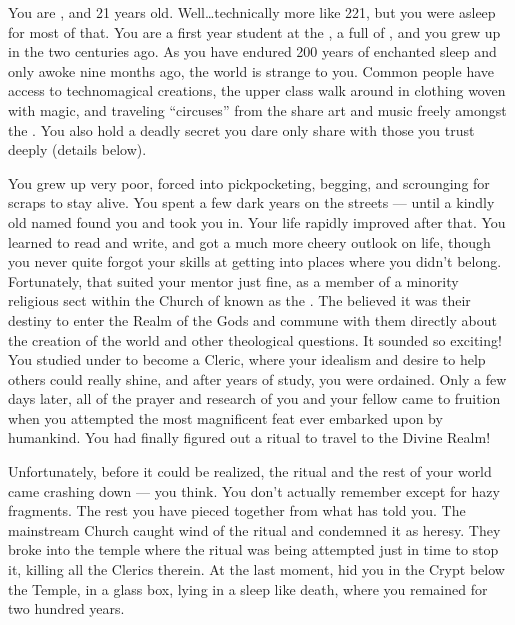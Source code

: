 \documentclass[char]{GL2020}
\begin{document}
\name{\cDisney{}}

You are \cDisney{\intro}, and 21 years old. Well\ldots{}technically more like 221, but you were asleep for most of that. You are a first year student at the \pSchool{}, a full \cDisney{\cleric} of \cFarmGod{}, and you grew up in the \pFarm{} two centuries ago. As you have endured 200 years of enchanted sleep and only awoke nine months ago, the world is strange to you. Common people have access to technomagical creations, the upper class walk around in clothing woven with magic, and traveling ``circuses'' from the \pTech{} share art and music freely amongst the \pFarmers{}. You also hold a deadly secret you dare only share with those you trust deeply (details below). 

You grew up very poor, forced into pickpocketing, begging, and scrounging for scraps to stay alive. You spent a few dark years on the streets — until a kindly old \cDisneyMentor{\cleric} named \cDisneyMentor{} found you and took you in. Your life rapidly improved after that. You learned to read and write, and got a much more cheery outlook on life, though you never quite forgot your skills at getting into places where you didn't belong. Fortunately, that suited your mentor just fine, as \cDisneyMentor{\theywere} a member of a minority religious sect within the Church of \cFarmGod{} known as the \cDisneySect{}. The \cDisneySect{} believed it was their destiny to enter the Realm of the Gods and commune with them directly about the creation of the world and other theological questions. It sounded so exciting! You studied under \cDisneyMentor{} to become a Cleric, where your idealism and desire to help others could really shine, and after years of study, you were ordained. Only a few days later, all of the prayer and research of you and your fellow \cDisneySect{} came to fruition when you attempted the most magnificent feat ever embarked upon by humankind. You had finally figured out a ritual to travel to the Divine Realm!

Unfortunately, before it could be realized, the ritual and the rest of your world came crashing down — you think. You don't actually remember except for hazy fragments. The rest you have pieced together from what \cWildCard{} has told you. The mainstream Church caught wind of the ritual and condemned it as heresy. They broke into the temple where the ritual was being attempted just in time to stop it, killing all the Clerics therein. At the last moment, \cDisneyMentor{} hid you in the Crypt below the Temple, in a glass box, lying in a sleep like death, where you remained for two hundred years. 
\end{document}
